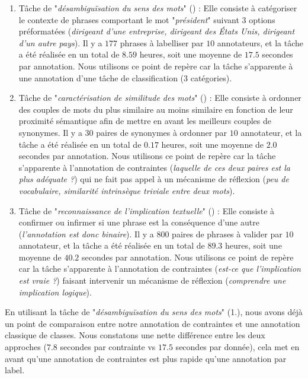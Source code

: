 			\begin{enumerate}
				\item Tâche de "\textit{désambiguïsation du sens des mots}" (\cite{pradhan-etal:2007:semeval2007-task-17}) :
				Elle consiste à catégoriser le contexte de phrases comportant le mot "\textit{président}" suivant $3$ options préformatées (\textit{dirigeant d'une entreprise, dirigeant des États Unis, dirigeant d'un autre pays}).
				Il y a $177$ phrases à labelliser par $10$ annotateurs, et la tâche a été réalisée en un total de $8.59$ heures, soit une moyenne de $17.5$ secondes par annotation.
				Nous utilisons ce point de repère car la tâche s'apparente à une annotation d'une tâche de classification ($3$ catégories).
				\item Tâche de "\textit{caractérisation de similitude des mots}" (\cite{miller-charles:1991:contextual-correlates-semantic}) :
				Elle consiste à ordonner des couples de mots du plus similaire au moins similaire en fonction de leur proximité sémantique afin de mettre en avant les meilleurs couples de synonymes.
				Il y a $30$ paires de synonymes à ordonner par $10$ annotateur, et la tâche a été réalisée en un total de $0.17$ heures, soit une moyenne de $2.0$ secondes par annotation.
				Nous utilisons ce point de repère car la tâche s'apparente à l'annotation de contraintes (\textit{laquelle de ces deux paires est la plus adéquate ?}) qui ne fait pas appel à un mécanisme de réflexion (\textit{peu de vocabulaire, similarité intrinsèque triviale entre deux mots}).
				\item Tâche de "\textit{reconnaissance de l'implication textuelle}" (\cite{dagan-etal:2005:pascal-recognising-textual}) :
				Elle consiste à confirmer ou infirmer si une phrase est la conséquence d'une autre (\textit{l'annotation est donc binaire}).
				Il y a $800$ paires de phrases à valider par $10$ annotateur, et la tâche a été réalisée en un total de $89.3$ heures, soit une moyenne de $40.2$ secondes par annotation.
				Nous utilisons ce point de repère car la tâche s'apparente à l'annotation de contraintes (\textit{est-ce que l'implication est vraie ?}) faisant intervenir un mécanisme de réflexion (\textit{comprendre une implication logique}).
			\end{enumerate}
			En utilisant la tâche de "\textit{désambiguïsation du sens des mots}" (1.), nous avons déjà un point de comparaison entre notre annotation de contraintes et une annotation classique de classes.
			Nous constatons une nette différence entre les deux approches ($7.8$ secondes par contrainte vs $17.5$ secondes par donnée), cela met en avant qu'une annotation de contraintes est plus rapide qu'une annotation par label.
			
